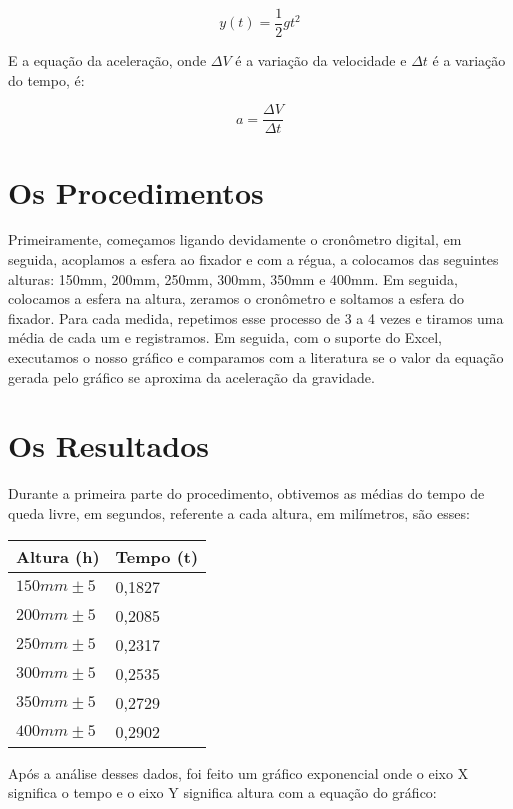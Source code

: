 \documentclass[a4paper, 12pt]{article}
\begin{document}
\begin{equation}
    y(t) = \frac{1}{2}gt^{2}
\end{equation}

E a equação da aceleração, onde $\Delta V$ é a variação da velocidade e $\Delta t$ é a variação do tempo, é:

\begin{equation}
    a = \frac{\Delta V}{\Delta t}
\end{equation}

\section{Os Procedimentos}
Primeiramente, começamos ligando devidamente o cronômetro digital, em seguida, acoplamos a esfera ao fixador e com a régua, a colocamos das seguintes alturas: 150mm, 200mm, 250mm, 300mm, 350mm e 400mm. Em seguida, colocamos a esfera na altura, zeramos o cronômetro e soltamos a esfera do fixador. Para cada medida, repetimos esse processo de 3 a 4 vezes e tiramos uma média de cada um e registramos. Em seguida, com o suporte do Excel, executamos o nosso gráfico e comparamos com a literatura se o valor da equação gerada pelo gráfico se aproxima da aceleração da gravidade.

\section{Os Resultados}
Durante a primeira parte do procedimento, obtivemos as médias do tempo de queda livre, em segundos, referente a cada altura, em milímetros, são esses:

\begin{table}[!ht]
    \centering
    \begin{tabular}{|l|l|}
    \hline
        \textbf{Altura (h)} & \textbf{Tempo (t)} \\ \hline
        $150mm \pm 5$ & 0,1827 \\ \hline
        $200mm \pm 5$ & 0,2085 \\ \hline
        $250mm \pm 5$ & 0,2317 \\ \hline
        $300mm \pm 5$ & 0,2535 \\ \hline
        $350mm \pm 5$ & 0,2729 \\ \hline
        $400mm \pm 5$ & 0,2902 \\ \hline
    \end{tabular}
\end{table}

Após a análise desses dados, foi feito um gráfico exponencial onde o eixo X significa o tempo e o eixo Y significa altura com a equação do gráfico:
\end{document}
